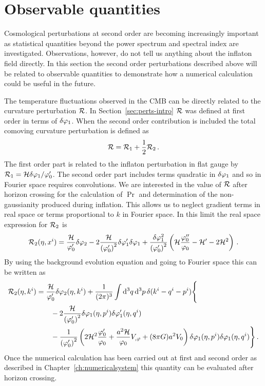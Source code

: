\section{Observable quantities}
\label{sec:observable-perts}

Cosmological perturbations at second order are becoming increasingly important as
statistical quantities beyond the power spectrum and spectral index are
investigated. Observations, however, do not tell us anything about the inflaton
field directly. In this section the second order perturbations described above will
be related to observable quantities to demonstrate how a numerical calculation could
be useful in the future.
% 

The temperature fluctuations observed in the CMB can
be directly related to the curvature perturbation $\mathcal{R}$. In
Section~\ref{sec:perts-intro} $\mathcal{R}$ was defined at first order in terms of $\delta\varphi_{1}$.
When the second order contribution is included the total comoving curvature
perturbation is defined as
% 
\begin{equation}
\label{eq:Rfulldefn-perts}
 \mathcal{R} = \mathcal{R}_1 + \frac{1}{2}\mathcal{R}_2\,.
\end{equation}
% 
The first order part is related to the inflaton perturbation in flat gauge by $\mathcal{R}_1
= \mathcal{H}\delta\varphi_{1}/\varphi_0'$. The second order part includes terms quadratic in $\delta\varphi_{1}$ and so
in Fourier space requires convolutions. We are interested in the value of $\mathcal{R}$ after
horizon crossing for the calculation of $\Pr$ and determination of the
non-gaussianity produced during inflation. This allows us to neglect gradient terms
in real space or terms proportional to $k$ in Fourier space.
In this limit the real space expression for $\mathcal{R}_2$ is \cite{Malik:2005cy}
% 
\begin{equation}
 \label{eq:R2real-perts}
\mathcal{R}_2(\eta, x^i) = \frac{\mathcal{H}}{\varphi_0'}\delta\varphi_{2} - 2\frac{\mathcal{H}}{\left(\varphi_0'\right)^2}
\delta\varphi_{1}'\delta\varphi_{1} + \frac{\delta\varphi_{1}^2}{\left(\varphi_0'\right)^2}\left(\mathcal{H}\frac{\varphi_0''}{\varphi_0} 
 - \mathcal{H}' -2\mathcal{H}^2 \right)\,.
\end{equation}
% 
By using the background evolution equation  and going to Fourier
space this can be written as
% 
\begin{align}
 \R_2(\eta, \kvi) &= \frac{\H}{\vp_0'}\dvp2(\eta, \kvi) 
  + \frac{1}{(2\pi)^3}\int \d^3q\, \d^3p\, \delta(\kvi-\qvi-\pvi) \Bigg\{
\nonumber\\
% 
 &\qquad -2\frac{\H}{\left(\vp_0'\right)^2} \dvp1(\eta, \pvi)\dvp1'(\eta, \qvi) \nonumber\\
%  
&\qquad -\frac{1}{\left(\vp_0'\right)^2} \left(
  2\H^2 \frac{\vp_0'}{\vp_0} + \frac{a^2 \H}{\vp_0}\Uphi + (8\pi G)a^2 \U
 \right)
\dvp1(\eta,\pvi) \dvp1(\eta, \qvi)\Bigg\}\,.
\end{align}
% 
Once the numerical calculation has been carried out at first and second order as
described in Chapter~\ref{ch:numericalsystem} this quantity can be evaluated after
horizon crossing.

